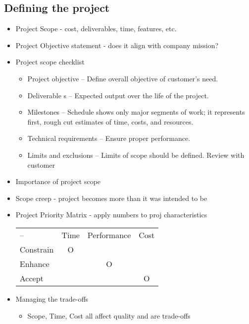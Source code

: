 \documentclass[8pt, letter]{extarticle}
\begin{document}
\begin{multicols}{2}
    \subsection{Defining the project}
    \begin{itemize}
        \item Project Scope - cost, deliverables, time, features, etc.
        \item Project Objective statement - does it align with company mission?
        \item Project scope checklist
            \begin{itemize}
                \item Project objective – Define overall objective of customer's need. 
                \item Deliverable s – Expected output over the life of the project. 
                \item Milestones – Schedule shows only major segments of work; it represents first, rough cut estimates of time, costs, and resources. 
                \item Technical requirements – Ensure proper performance. 
                \item Limits and exclusions – Limits of scope should be defined. Review with customer
            \end{itemize}
        \item Importance of project scope
        \item Scope creep - project becomes more than it was intended to be
        \item Project Priority Matrix - apply numbers to proj characteristics
            \\
            \begin{tabular}{ l c c c }
                --&         Time&Performance& Cost  \\
                Constrain   &   O   &       &       \\
                Enhance     &       &   O   &       \\
                Accept      &       &       &   O   \\
            \end{tabular}
        \item Managing the trade-offs
            \begin{itemize}
                \item Scope, Time, Cost all affect quality and are trade-offs
            \end{itemize}

\end{itemize}
\end{multicols}
\end{document}
